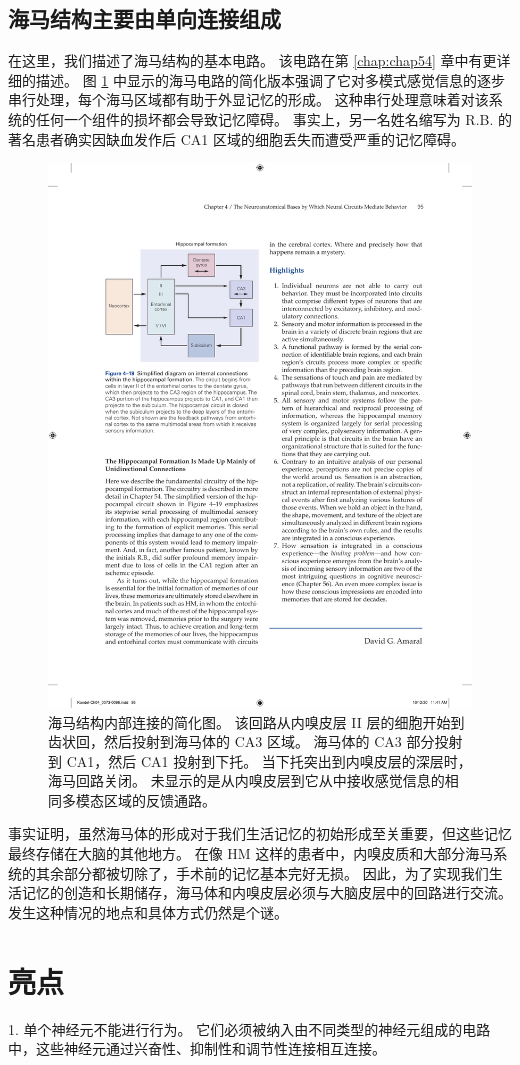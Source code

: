 \subsection{海马结构主要由单向连接组成}

在这里，我们描述了海马结构的基本电路。 
该电路在第 \ref{chap:chap54} 章中有更详细的描述。
图 \ref{fig:4_19} 中显示的海马电路的简化版本强调了它对多模式感觉信息的逐步串行处理，每个海马区域都有助于外显记忆的形成。 
这种串行处理意味着对该系统的任何一个组件的损坏都会导致记忆障碍。 
事实上，另一名姓名缩写为 R.B. 的著名患者确实因缺血发作后 CA1 区域的细胞丢失而遭受严重的记忆障碍。

\begin{figure}[htbp]
	\centering
	\includegraphics[width=0.5\linewidth]{chap04/fig_4_19}
	\caption{海马结构内部连接的简化图。 
		该回路从内嗅皮层 II 层的细胞开始到齿状回，然后投射到海马体的 CA3 区域。 
		海马体的 CA3 部分投射到 CA1，然后 CA1 投射到下托。 
		当下托突出到内嗅皮层的深层时，海马回路关闭。 
		未显示的是从内嗅皮层到它从中接收感觉信息的相同多模态区域的反馈通路。}
	\label{fig:4_19}
\end{figure}

事实证明，虽然海马体的形成对于我们生活记忆的初始形成至关重要，但这些记忆最终存储在大脑的其他地方。 
在像 HM 这样的患者中，内嗅皮质和大部分海马系统的其余部分都被切除了，手术前的记忆基本完好无损。 
因此，为了实现我们生活记忆的创造和长期储存，海马体和内嗅皮层必须与大脑皮层中的回路进行交流。 
发生这种情况的地点和具体方式仍然是个谜。


\section{亮点}

1. 单个神经元不能进行行为。 它们必须被纳入由不同类型的神经元组成的电路中，这些神经元通过兴奋性、抑制性和调节性连接相互连接。

